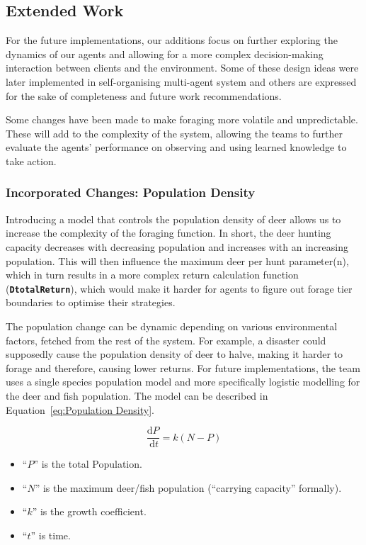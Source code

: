 \subsection{Extended Work}

For the future implementations, our additions focus on further exploring the dynamics of our agents and allowing for a more complex decision-making interaction between clients and the environment. Some of these design ideas were later implemented in self-organising multi-agent system and others are expressed for the sake of completeness and future work recommendations.

Some changes have been made to make foraging more volatile and unpredictable. These will add to the complexity of the system, allowing the teams to further evaluate the agents’ performance on observing and using learned knowledge to take action.

\subsubsection{Incorporated Changes: Population Density}

Introducing a model that controls the population density of deer allows us to increase the complexity of the foraging function. In short, the deer hunting capacity decreases with decreasing population and increases with an increasing population. This will then influence the maximum deer per hunt parameter(n), which in turn results in a more complex return calculation function (\texttt{\textbf{DtotalReturn}}), which would make it harder for agents to figure out forage tier boundaries to optimise their strategies.

The population change can be dynamic depending on various environmental factors, fetched from the rest of the system. For example, a disaster could supposedly cause the population density of deer to halve, making it harder to forage and therefore, causing lower returns. For future implementations, the team uses a single species population model and more specifically logistic modelling for the deer and fish population. The model can be described in Equation~\eqref{eq:Population Density}.

\begin{equation}
\frac{\mathrm{d} P}{\mathrm{~d} t}=k(N-P)
\label{eq:Population Density}
\end{equation}

\begin{itemize}
        \item “$P$” is the total Population. \item “$N$” is the maximum deer/fish population (“carrying capacity” formally).
        \item “$k$” is the growth coefficient.
        \item “$t$” is time.
    \end{itemize}

